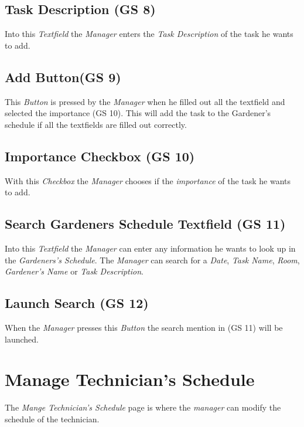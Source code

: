 \subsection{Task Description (GS 8)}
Into this \emph{Textfield} the \emph{Manager} enters the \emph{Task Description}
of the task he wants to add.

\subsection{Add Button(GS 9)}
This \emph{Button} is pressed by the \emph{Manager} when he filled out all
the textfield and selected the importance (GS 10). This will add the task to the
Gardener's schedule if all the textfields are filled out correctly.

\subsection{Importance Checkbox (GS 10)}
With this \emph{Checkbox} the \emph{Manager} chooses if the \emph{importance} of
the task he wants to add.

\subsection{Search Gardeners Schedule Textfield (GS 11)}
Into this \emph{Textfield} the \emph{Manager} can enter any information he wants
to look up in the \emph{Gardeners's Schedule}. The \emph{Manager} can search for
a \emph{Date}, \emph{Task Name}, \emph{Room}, \emph{Gardener's Name} or
\emph{Task Description}.

\subsection{Launch Search (GS 12)}
When the \emph{Manager} presses this \emph{Button} the search mention in (GS
11) will be launched.




\newpage
\section{Manage Technician's Schedule}
\label{sec:appendix_ManageTechnicianSchedule}
\mbox{} \par
\noindent{}

The \emph{Mange Technician's Schedule} page is where the \emph{manager}
can modify the schedule of the technician.

